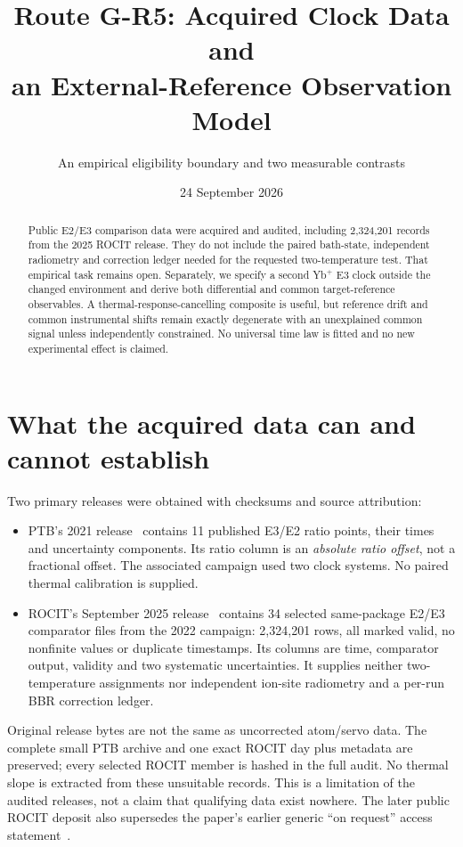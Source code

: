 \documentclass[11pt,a4paper]{article}
\title{Route G-R5: Acquired Clock Data and\protect\\an External-Reference Observation Model}
\author{An empirical eligibility boundary and two measurable contrasts}
\date{24 September 2026}
\begin{document}
\maketitle
\begin{abstract}
Public E2/E3 comparison data were acquired and audited, including
2,324,201 records from the 2025 ROCIT release. They do not include the
paired bath-state, independent radiometry and correction ledger needed
for the requested two-temperature test. That empirical task remains
open. Separately, we specify a second Yb$^+$ E3 clock outside the changed
environment and derive both differential and common target-reference
observables. A thermal-response-cancelling composite is useful, but
reference drift and common instrumental shifts remain exactly degenerate
with an unexplained common signal unless independently constrained.
No universal time law is fitted and no new experimental effect is claimed.
\end{abstract}

\section{What the acquired data can and cannot establish}
Two primary releases were obtained with checksums and source attribution:
\begin{itemize}
\item PTB's 2021 release~\cite{ptb} contains 11 published E3/E2 ratio
points, their times and uncertainty components. Its ratio column is
an \emph{absolute ratio offset}, not a fractional offset. The associated
campaign used two clock systems. No paired thermal calibration is supplied.
\item ROCIT's September 2025 release~\cite{rocit} contains 34 selected
same-package E2/E3 comparator files from the 2022 campaign: 2,324,201
rows, all marked valid, no nonfinite values or duplicate timestamps.
Its columns are time, comparator output, validity and two systematic
uncertainties. It supplies neither two-temperature assignments nor
independent ion-site radiometry and a per-run BBR correction ledger.
\end{itemize}
Original release bytes are not the same as uncorrected atom/servo data.
The complete small PTB archive and one exact ROCIT day plus metadata
are preserved; every selected ROCIT member is hashed in the full audit.
No thermal slope is extracted from these unsuitable records. This is
a limitation of the audited releases, not a claim that qualifying data
exist nowhere. The later public ROCIT deposit also supersedes the
paper's earlier generic ``on request'' access statement~\cite{network}.
\end{document}
